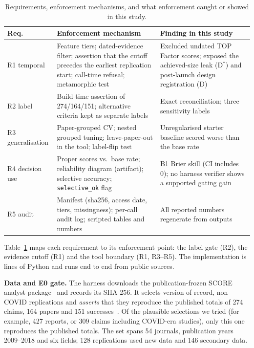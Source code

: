 \documentclass[conference]{IEEEtran}
\begin{document}
\begin{table}[t]\centering
\caption{Requirements, enforcement mechanisms, and what enforcement caught or showed in this study.}\label{tab:req}
\scriptsize\setlength{\tabcolsep}{2.5pt}
\begin{tabular}{@{}p{}p{}p{}@{}}\toprule
Req. & Enforcement mechanism & Finding in this study \\\midrule
R1 temporal & Feature tiers; dated-evidence filter; assertion that the cutoff precedes the earliest replication start; call-time refusal; metamorphic test & Excluded undated TOP Factor scores; exposed the achieved-size leak (D$^{*}$) and post-launch design registration (D) \\
R2 label & Build-time assertion of 274/164/151; alternative criteria kept as separate labels & Exact reconciliation; three sensitivity labels \\
R3 generalisation & Paper-grouped CV; nested grouped tuning; leave-paper-out in the tool; label-flip test & Unregularised starter baseline scored worse than the base rate \\
R4 decision use & Proper scores vs.\ base rate; reliability diagram (artifact); selective accuracy; \texttt{selective\_ok} flag & B1 Brier skill \bssBone{} (CI includes 0); no harness verifier shows a supported gating gain \\
R5 audit & Manifest (sha256, access date, tiers, missingness); per-call audit log; scripted tables and numbers & All reported numbers regenerate from outputs \\
\bottomrule\end{tabular}\end{table}

Table~\ref{tab:req} maps each requirement to its enforcement point: the label gate (R2), the evidence cutoff (R1) and the tool boundary (R1, R3--R5). The implementation is \locPython{} lines of Python and runs end to end from public sources.

\textbf{Data and E0 gate.} The harness downloads the publication-frozen SCORE analyst package~\cite{score_g5sny} and records its SHA-256. It selects version-of-record, non-COVID replications and \emph{asserts} that they reproduce the published totals of 274 claims, 164 papers and 151 successes~\cite{tyner2026}. Of the plausible selections we tried (for example, 427 reports, or 309 claims including COVID-era studies), only this one reproduces the published totals. The set spans 54 journals, publication years 2009--2018 and six fields; 128 replications used new data and 146 secondary data.
\end{document}
